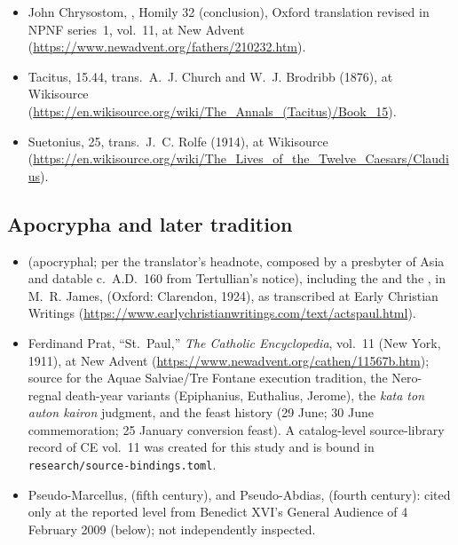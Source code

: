 \begin{itemize}
trans.\ E.~C. Richardson, NPNF series~2, vol.~3, at New Advent
(\url{https://www.newadvent.org/fathers/2708.htm}).
\item John Chrysostom, ,
Homily 32 (conclusion), Oxford translation revised in NPNF series~1,
vol.~11, at New Advent
(\url{https://www.newadvent.org/fathers/210232.htm}).
\item Tacitus,  15.44, trans.\ A.~J. Church and W.~J.
Brodribb (1876), at Wikisource
(\url{https://en.wikisource.org/wiki/The_Annals_(Tacitus)/Book_15}).
\item Suetonius,  25, trans.\ J.~C. Rolfe (1914), at
Wikisource
(\url{https://en.wikisource.org/wiki/The_Lives_of_the_Twelve_Caesars/Claudius}).
\end{itemize}

\subsection*{Apocrypha and later tradition}

\begin{itemize}
\item {} (apocryphal; per the translator's headnote,
composed by a presbyter of Asia and datable c.~A.D.\ 160 from
Tertullian's notice), including the  and
the , in M.~R. James,  (Oxford: Clarendon, 1924), as transcribed at Early Christian
Writings (\url{https://www.earlychristianwritings.com/text/actspaul.html}).
\item Ferdinand Prat, ``St.~Paul,'' \textit{The Catholic Encyclopedia},
vol.~11 (New York, 1911), at New Advent
(\url{https://www.newadvent.org/cathen/11567b.htm}); source for the
Aquae Salviae/Tre Fontane execution tradition, the Nero-regnal death-year
variants (Epiphanius, Euthalius, Jerome), the \textit{kata ton auton
kairon} judgment, and the feast history (29 June; 30 June commemoration;
25 January conversion feast). A catalog-level source-library record of CE
vol.~11 was created for this study and is bound in
\texttt{research/source-bindings.toml}.
\item Pseudo-Marcellus,  (fifth century),
and Pseudo-Abdias,  (fourth century): cited only at
the reported level from Benedict XVI's General Audience of 4 February
2009 (below); not independently inspected.
\end{itemize}

